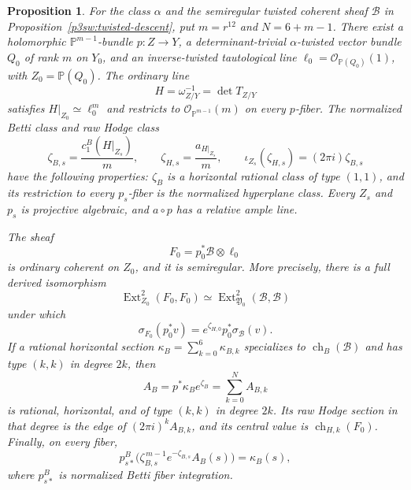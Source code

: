 \documentclass[11pt]{article}
\newtheorem{proposition}[theorem]{Proposition}
\numberwithin{equation}{section}
\begin{document}
\begin{proposition}
\label{p3sw:ordinary-conversion}
For the class \(\alpha\) and the semiregular twisted coherent sheaf
\(\mathcal B\) in Proposition~\ref{p3sw:twisted-descent}, put
\(m=r^{12}\) and \(N=6+m-1\).  There exist a holomorphic
\(\mathbb P^{m-1}\)-bundle \(p:Z\to Y\), a determinant-trivial
\(\alpha\)-twisted vector bundle \(Q_0\) of rank \(m\) on \(Y_0\), and
an inverse-twisted tautological line
\(\ell_0=\mathcal O_{\mathbb P(Q_0)}(1)\), with \(Z_0=\mathbb P(Q_0)\).
The ordinary line
\begin{equation}
\label{p3sw:descent-anticanonical}
 H=\omega_{Z/Y}^{-1}=\det T_{Z/Y}
\end{equation}
satisfies \(H|_{Z_0}\simeq\ell_0^m\) and restricts to
\(\mathcal O_{\mathbb P^{m-1}}(m)\) on every \(p\)-fiber.  The
normalized Betti class and raw Hodge class
\begin{equation}
\label{p3sw:descent-zeta}
 \zeta_{B,s}=\frac{c_1^B(H|_{Z_s})}{m},\qquad
 \zeta_{H,s}=\frac{a_{H|_{Z_s}}}{m},\qquad
 \iota_{Z_s}(\zeta_{H,s})=(2\pi i)\zeta_{B,s}
\end{equation}
have the following properties: \(\zeta_B\) is a horizontal rational
class of type \((1,1)\), and its restriction to every \(p_s\)-fiber
is the normalized hyperplane class.  Every \(Z_s\) and \(p_s\) is
projective algebraic, and \(a\circ p\) has a relative ample line.

The sheaf
\[
 F_0=p_0^*\mathcal B\otimes\ell_0
\]
is ordinary coherent on \(Z_0\), and it is semiregular.  More precisely,
there is a full derived isomorphism
\begin{equation}
\label{p3sw:descent-ordinary-ext}
 \operatorname{Ext}^2_{Z_0}(F_0,F_0)
       \simeq\operatorname{Ext}^2_{\mathfrak Y_0}(\mathcal B,\mathcal B)
\end{equation}
under which
\begin{equation}
\label{p3sw:descent-ordinary-sigma}
 \sigma_{F_0}(p_0^*v)
       =e^{\zeta_{H,0}}p_0^*\sigma_{\mathcal B}(v).
\end{equation}
If a rational horizontal section
\(\kappa_B=\sum_{k=0}^6\kappa_{B,k}\) specializes to
\(\operatorname{ch}_B(\mathcal B)\) and has type \((k,k)\) in degree
\(2k\), then
\begin{equation}
\label{p3sw:descent-horizontal-character}
 A_B=p^*\kappa_B e^{\zeta_B}=\sum_{k=0}^{N}A_{B,k}
\end{equation}
is rational, horizontal, and of type \((k,k)\) in degree \(2k\).
Its raw Hodge section in that degree is the edge of
\((2\pi i)^kA_{B,k}\), and its central value is
\(\operatorname{ch}_{H,k}(F_0)\).  Finally, on every fiber,
\begin{equation}
\label{p3sw:descent-extraction}
 p_{s*}^B\bigl(\zeta_{B,s}^{\,m-1}e^{-\zeta_{B,s}}A_B(s)\bigr)
       =\kappa_B(s),
\end{equation}
where \(p_{s*}^B\) is normalized Betti fiber integration.
\end{proposition}
\end{document}
